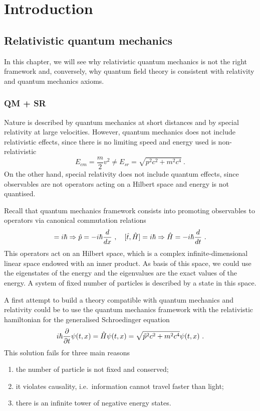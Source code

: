 \part{Introduction}

\chapter{Relativistic quantum mechanics}

    In this chapter, we will see why relativistic quantum mechanics is not the right framework and, conversely, why quantum field theory is consistent with relativity and quantum mechanics axioms.

\section{QM + SR}

    Nature is described by quantum mechanics at short distances and by special relativity at large velocities. However, quantum mechanics does not include relativistic effects, since there is no limiting speed and energy used is non-relativistic
    \begin{equation*}
        E_{cm} = \frac{m}{2} v^2 \neq E_{sr} = \sqrt{p^2 c^2 + m^2 c^4} ~.
    \end{equation*}
    On the other hand, special relativity does not include quantum effects, since observables are not operators acting on a Hilbert space and energy is not quantised. 
    
    Recall that quantum mechanics framework consists into promoting observables to operators via canonical commutation relations 
    \begin{equation*}
        [\hat x, \hat p] = i \hbar \Rightarrow \hat p = - i \hbar \dv{}{x} ~, \quad [\hat t, \hat H] = i \hbar \Rightarrow \hat H = - i \hbar \dv{}{t} ~.
    \end{equation*}
    This operators act on an Hilbert space, which is a complex infinite-dimensional linear space endowed with an inner product. As basis of this space, we could use the eigenstates of the energy and the eigenvalues are the exact values of the energy. A system of fixed number of particles is described by a state in this space.

    A first attempt to build a theory compatible with quantum mechanics and relativity could be to use the quantum mechanics framework with the relativistic hamiltonian for the generalised Schroedinger equation
    \begin{equation*}
        i \hbar \frac{\partial}{\partial t} \psi(t, x) = \hat H \psi(t, x) = \sqrt{\hat p^2 c^2 + m^2 c^4} \psi(t, x) ~.
    \end{equation*}
    This solution fails for three main reasons
    \begin{enumerate}
        \item the number of particle is not fixed and conserved;
        \item it violates causality, i.e.~information cannot travel faster than light;
        \item there is an infinite tower of negative energy states.
    \end{enumerate}

